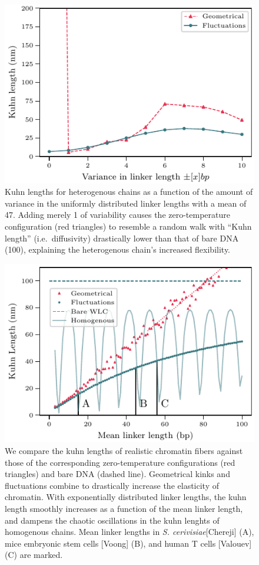 \documentclass[%
 reprint,
superscriptaddress,
showpacs,preprintnumbers,
 amsmath,amssymb,
 aps,
 prl,
]{revtex4-1}
\begin{document}
\begin{figure}[t]
    \centering
    \includegraphics{./figures/fig4_kuhn_length_vs_window_size_mu47bp.pdf}
    \caption{Kuhn lengths for heterogenous chains as a function of
     the amount of variance in the uniformly distributed linker lengths with a mean
     of \SI{47}{\basepair}. Adding merely \SI{1}{\basepair} of variability causes the
     zero-temperature configuration (red triangles) to resemble a random walk with ``Kuhn
     length'' (i.e.\ diffusivity) drastically lower than that of bare DNA
     (\SI{100}{\basepair}), explaining the heterogenous chain's increased
    flexibility.}\label{fig:box-kuhns}
\end{figure}


\begin{figure}[t]
    \centering
    \includegraphics{./figures/fig3_kuhn_exponential.pdf}
    \caption{We compare the kuhn lengths of realistic chromatin fibers
    against those of the corresponding zero-temperature configurations (red
    triangles) and bare DNA (dashed line). Geometrical kinks and fluctuations
    combine to drastically increase the elasticity of chromatin. With exponentially
    distributed linker lengths, the kuhn length smoothly increases as a function
    of the mean linker length, and dampens the chaotic oscillations in the kuhn
    lenghts of homogenous chains. Mean linker
    lengths in \textit{S.  cerivisiae}[Chereji] (A), mice embryonic stem cells
    [Voong] (B), and human T cells  [Valouev] (C)  are marked.}\label{fig:exp-kuhns}
\end{figure}
\end{document}
